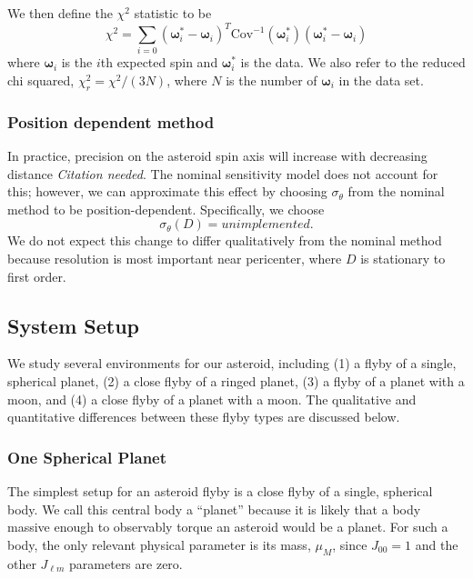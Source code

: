 \documentclass[linenumbers]{aastex631}
\newcommand{\jtd}[1]{{\color{red}\textit{#1}}}
\begin{document}
We then define the $\chi^2$ statistic to be
\begin{equation}
\chi^2 = \sum_{i=0} (\bm \omega_i^* - \bm \omega_i)^T\text{Cov}^{-1}(\bm\omega^*_i)(\bm \omega_i^* - \bm \omega_i)
\end{equation}
where $\bm \omega_i$ is the $i$th expected spin and $\bm \omega_i^*$ is the data. We also refer to the reduced chi squared, $\chi^2_r = \chi^2 / (3N)$, where $N$ is the number of $\bm \omega_i$ in the data set.


\subsubsection{Position dependent method}
In practice, precision on the asteroid spin axis will increase with decreasing distance \jtd{Citation needed}. The nominal sensitivity model does not account for this; however, we can approximate this effect by choosing $\sigma_\theta$ from the nominal method to be position-dependent. Specifically, we choose
\begin{equation}
\sigma_\theta(D) = unimplemented.
\label{eqn:pos-dependent-sensitivity}
\end{equation}
We do not expect this change to differ qualitatively from the nominal method because resolution is most important near pericenter, where $D$ is stationary to first order.



\subsection{System Setup}
We study several environments for our asteroid, including (1) a flyby of a single, spherical planet, (2) a close flyby of a ringed planet, (3) a flyby of a planet with a moon, and (4) a close flyby of a planet with a moon. The qualitative and quantitative differences between these flyby types are discussed below.

\subsubsection{One Spherical Planet}
The simplest setup for an asteroid flyby is a close flyby of a single, spherical body. We call this central body a ``planet'' because it is likely that a body massive enough to observably torque an asteroid would be a planet. For such a body, the only relevant physical parameter is its mass, $\mu_M$, since $J_{00} = 1$ and the other $J_{\ell m}$ parameters are zero.
\end{document}
